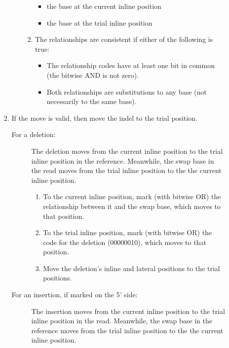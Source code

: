 \documentclass[11pt]{article}
\begin{document}
\begin{enumerate}
\begin{enumerate}
\begin{enumerate}
\begin{itemize}
\begin{enumerate}
\begin{itemize}
                        \item the base at the current inline position
                        \item the base at the trial inline position
                    \end{itemize}
                    \item The relationships are consistent if either of the following is true:
                    \begin{itemize}
                        \item The relationship codes have at least one bit in common (the bitwise AND is not zero).
                        \item Both relationships are substitutions to any base (not necessarily to the same base).
                    \end{itemize}
                \end{enumerate}
            \end{itemize}
            \item If the move is valid, then move the indel to the trial position.
            \begin{description}
                \item[For a deletion:] The deletion moves from the current inline position to the trial inline position in the reference.
                Meanwhile, the swap base in the read moves from the trial inline position to the the current inline position.
                \begin{enumerate}
                    \item To the current inline position, mark (with bitwise OR) the relationship between it and the swap base, which moves to that position.
                    \item To the trial inline position, mark (with bitwise OR) the code for the deletion (00000010), which moves to that position.
                    \item Move the deletion's inline and lateral positions to the trial positions.
                \end{enumerate}
                \item[For an insertion, if marked on the 5' side:] The insertion moves from the current inline position to the trial inline position in the read.
                Meanwhile, the swap base in the reference moves from the trial inline position to the the current inline position.
                \begin{enumerate}

\end{enumerate}
\end{description}
\end{enumerate}
\end{enumerate}
\end{enumerate}
\end{document}

